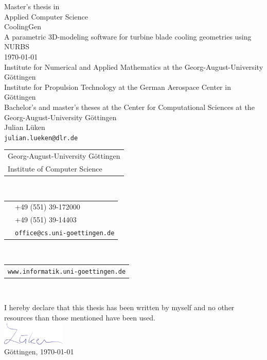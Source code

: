 \documentclass[a4paper, 11pt]{report}
\theoremstyle{definition}
\newcommand{\mytitle}[1]{\LARGE{#1}\normalsize\\[0.3em]}
\newcommand{\titlespace}{\vspace{2em}}
\newcommand{\hugespace}{\vspace{17em}}
\begin{document}
\begin{titlepage}
\begin{center}
\begin{minipage}{.49\textwidth}
			\begin{center}
				\vspace{2cm}
				Master's thesis in\\
				Applied Computer Science\\
				\titlespace
				\mytitle{CoolingGen}
				A parametric 3D-modeling software for turbine blade cooling geometries using NURBS\\
				\titlespace
				\today\\
				\hugespace
				Institute for Numerical and Applied Mathematics at the Georg-August-University Göttingen\\
				\titlespace
				Institute for Propulsion Technology at the German Aerospace Center in Göttingen\\
				\titlespace
				Bachelor's and master's theses at the Center for Computational Sciences at the Georg-August-University Göttingen\\
				\titlespace
				Julian Lüken\\
				\texttt{julian.lueken@dlr.de}\\
			\end{center}
		\end{minipage}
	\end{center}
\end{titlepage}
\pagebreak

\pagestyle{empty}
\restoregeometry
{}
\noindent
\begin{tabular}{l}
Georg-August-University Göttingen\\
Institute of Computer Science\\
\end{tabular}\\[1em]
\begin{tabular}{ll}
	\Telefon 	&+49 (551) 39-172000\\
	\FAX 		&+49 (551) 39-14403\\
	\Letter 	&\texttt{office@cs.uni-goettingen.de}\\
\end{tabular}\\[1em]
\begin{tabular}{l}
\texttt{www.informatik.uni-goettingen.de}\\
\end{tabular}\\[1em]
\pagebreak

\noindent I hereby declare that this thesis has been written by myself and no other resources than those mentioned have been used.\\[0.7em]
\phantom{H}\includegraphics[height=3em]{../assets/formal/sign.png}\\[0.5em]
Göttingen, \today \hspace{2em}
\pagebreak
\end{document}
